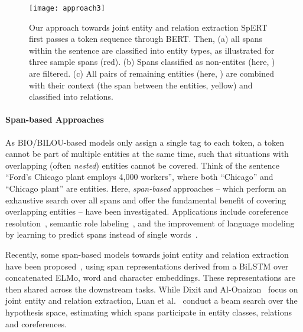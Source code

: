 \documentclass{ecai}
\begin{document}
\begin{figure*}
    \centering
    \texttt{[image: approach3]}
    \caption{Our approach towards joint entity and relation extraction SpERT first passes a token sequence through BERT. Then, (a) all spans within the sentence are classified into entity types, as illustrated for three sample spans  (red). (b) Spans classified as non-entites (here, ) are filtered. (c) All pairs of remaining entities (here, ) are combined with their context (the span between the entities, yellow) and classified into relations.
    }
    \label{fig:approach}
\end{figure*}

\paragraph{Span-based Approaches} As BIO/BILOU-based models only assign a single tag to each token, a token cannot be part of multiple entities at the same time, such that situations with overlapping (often {\it nested}) entities cannot be covered. Think of 
the sentence ``Ford's Chicago plant employs 4,000 workers'', where both ``Chicago'' and ``Chicago plant'' are entities.
Here, {\it span-based} approaches -- which perform an exhaustive search over all spans and offer the fundamental benefit of covering overlapping entities -- have been investigated. Applications include coreference resolution~\cite{lee:2017:span_coreference,lee:2018:span_coreference}, semantic role labeling~\cite{ouchi:2018:span_srl, he:2018:span_srl}, and the improvement of language modeling by learning to predict spans instead of single words~\cite{joshi:2019:span_bert}. 

Recently, some span-based models towards joint entity and relation extraction have been proposed~\cite{luan:2018:scierc,dixit:2019:span_rel}, using span representations derived from a BiLSTM over concatenated ELMo, word and character embeddings. These representations are then shared across the downstream tasks. 
While Dixit and Al-Onaizan~\cite{dixit:2019:span_rel} focus on joint entity and relation extraction, Luan et al.~\cite{luan:2018:scierc} conduct a beam search over the hypothesis space, estimating which spans participate in entity classes, relations and coreferences. 
\end{document}
